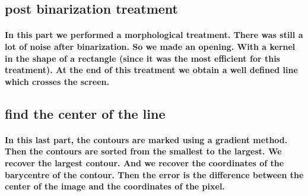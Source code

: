 \subsection{post binarization treatment}
\paragraph{In this part we performed a morphological treatment. There was still a lot of noise after binarization. So we made an opening. 
With a kernel in the shape of a rectangle (since it was the most efficient for this treatment).
At the end of this treatment we obtain a well defined line which crosses the screen. }

\subsection{find the center of the line}
\paragraph{ In this last part, the contours are marked using a gradient method. Then the contours are sorted from the smallest to the largest.
We recover the largest contour.
And we recover the coordinates of the barycentre of the contour.
Then the error is the difference between the center of the image and the coordinates of the pixel.}
